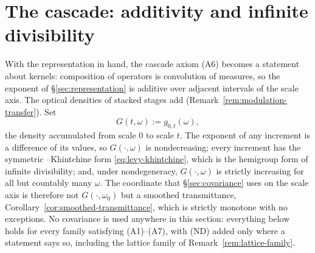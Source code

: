 %

\section{The cascade: additivity and infinite divisibility}\label{sec:cascade}

With the representation in hand, the cascade axiom (A6) becomes a statement about kernels:
composition of operators is convolution of measures, so the exponent of
\S\ref{sec:representation} is additive over adjacent intervals of the scale axis. The optical
densities of stacked stages add (Remark~\ref{rem:modulation-transfer}). Set
\[
  G(t,\omega) := g_{0,t}(\omega),
\]
the density accumulated from scale $0$ to scale $t$. The exponent of any increment is a
difference of its values, so $G(\cdot,\omega)$ is nondecreasing; every increment has the
symmetric \Levy--Khintchine form \ref{eq:levy-khintchine}, which is the hemigroup form of
infinite divisibility; and, under nondegeneracy, $G(\cdot,\omega)$ is strictly increasing
for all but countably many $\omega$. The
coordinate that \S\ref{sec:covariance} uses on the scale axis is therefore not
$G(\cdot,\omega_0)$ but a smoothed transmittance, Corollary~\ref{cor:smoothed-transmittance},
which is strictly monotone with no exceptions. No covariance is used anywhere in this
section: everything below holds for every family satisfying (A1)--(A7), with (ND) added only
where a statement says so, including the lattice family of Remark~\ref{rem:lattice-family}.

